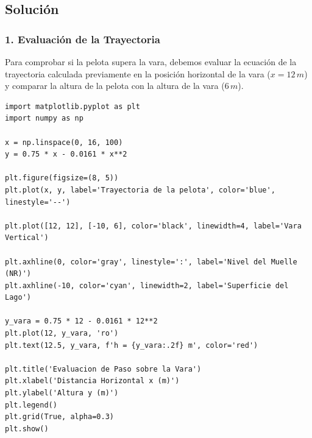 \documentclass[12pt, a4paper]{article}
\begin{document}
\begin{center}
\end{center}

\subsection*{Solución}

\subsubsection*{1. Evaluación de la Trayectoria}
Para comprobar si la pelota supera la vara, debemos evaluar la ecuación de la trayectoria calculada previamente en la posición horizontal de la vara ($x = 12 \, \si{m}$) y comparar la altura de la pelota con la altura de la vara ($6 \, \si{m}$).

\begin{lstlisting}
import matplotlib.pyplot as plt
import numpy as np

x = np.linspace(0, 16, 100)
y = 0.75 * x - 0.0161 * x**2

plt.figure(figsize=(8, 5))
plt.plot(x, y, label='Trayectoria de la pelota', color='blue', linestyle='--')

plt.plot([12, 12], [-10, 6], color='black', linewidth=4, label='Vara Vertical')

plt.axhline(0, color='gray', linestyle=':', label='Nivel del Muelle (NR)')
plt.axhline(-10, color='cyan', linewidth=2, label='Superficie del Lago')

y_vara = 0.75 * 12 - 0.0161 * 12**2
plt.plot(12, y_vara, 'ro')
plt.text(12.5, y_vara, f'h = {y_vara:.2f} m', color='red')

plt.title('Evaluacion de Paso sobre la Vara')
plt.xlabel('Distancia Horizontal x (m)')
plt.ylabel('Altura y (m)')
plt.legend()
plt.grid(True, alpha=0.3)
plt.show()
\end{lstlisting}
\end{document}
